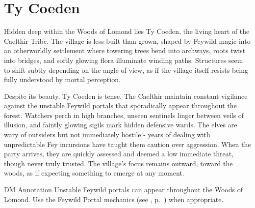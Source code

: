 \section*{Ty Coeden}
{\entryfont Hidden deep within the Woods of Lomond lies Ty Coeden, the living heart of the Caelthir Tribe. The village is less built than grown, shaped by Feywild magic into an otherworldly settlement where towering trees bend into archways, roots twist into bridges, and softly glowing flora illuminate winding paths. Structures seem to shift subtly depending on the angle of view, as if the village itself resists being fully understood by mortal perception.

Despite its beauty, Ty Coeden is tense. The Caelthir maintain constant vigilance against the unstable Feywild portals that sporadically appear throughout the forest. Watchers perch in high branches, unseen sentinels linger between veils of illusion, and faintly glowing sigils mark hidden defensive wards. The elves are wary of outsiders but not immediately hostile - years of dealing with unpredictable Fey incursions have taught them caution over aggression. When the party arrives, they are quickly assessed and deemed a low immediate threat, though never truly trusted. The village's focus remains outward, toward the woods, as if expecting something to emerge at any moment.}
\begingroup
	\DndSetThemeColor[PhbTan]
	\begin{DndComment}{DM Annotation}
		Unstable Feywild portals can appear throughout the Woods of Lomond. Use the Feywild Portal mechanics (see \hyperref[sec:FeywildPortals]{}, p.~\pageref{sec:FeywildPortals}) when appropriate.
	\end{DndComment}
\endgroup

